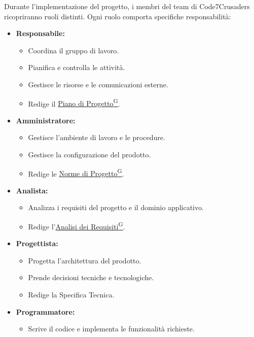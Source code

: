 Durante l'implementazione del progetto, i membri del team di Code7Crusaders ricopriranno ruoli distinti. Ogni ruolo comporta specifiche responsabilità:
\begin{itemize}
    \item \textbf{Responsabile:}
    \begin{itemize}
        \item Coordina il gruppo di lavoro.
        \item Pianifica e controlla le attività.
        \item Gestisce le risorse e le comunicazioni esterne.
        \item Redige il \href{https://code7crusaders.github.io/docs/RTB/documentazione_interna/glossario.html#piano-di-progetto}{Piano di Progetto\textsuperscript{G}}.
    \end{itemize}
    \item \textbf{Amministratore:}
    \begin{itemize}
        \item Gestisce l’ambiente di lavoro e le procedure.
        \item Gestisce la configurazione del prodotto.
        \item Redige le \href{https://code7crusaders.github.io/docs/RTB/documentazione_interna/glossario.html#norme-di-progetto}{Norme di Progetto\textsuperscript{G}}.
    \end{itemize}
    \item \textbf{Analista:}
    \begin{itemize}
        \item Analizza i requisiti del progetto e il dominio applicativo.
        \item Redige l’\href{https://code7crusaders.github.io/docs/RTB/documentazione_interna/glossario.html#analisi-dei-requisiti}{Analisi dei Requisiti\textsuperscript{G}}.
    \end{itemize}
    \item \textbf{Progettista:}
    \begin{itemize}
        \item Progetta l’architettura del prodotto.
        \item Prende decisioni tecniche e tecnologiche.
        \item Redige la Specifica Tecnica.
    \end{itemize}
    \item \textbf{Programmatore:}
    \begin{itemize}
        \item Scrive il codice e implementa le funzionalità richieste.

\end{itemize}
\end{itemize}

